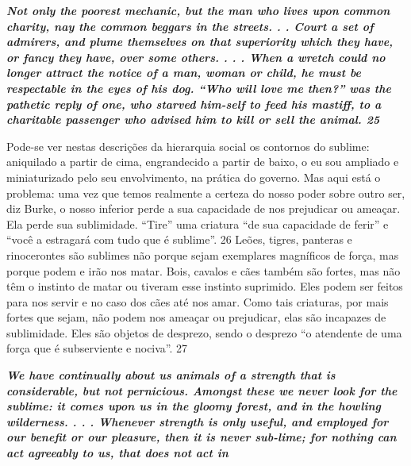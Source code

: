\par
 

 \textbf{\textit{Not only the poorest mechanic, but the man who lives upon common charity, nay the common beggars in the streets. . . Court a set of admirers, and plume themselves on that superiority which they have, or fancy they have, over some others. . . . When a wretch could no longer attract the notice of a man, woman or child, he must be respectable in the eyes of his dog. “Who will love me then?” was the pathetic reply of one, who starved him-self to feed his mastiff, to a charitable passenger who advised him to kill or sell the animal. {{\color{blue} 25} } } }  
 
 
\par
 
Pode-se ver nestas descrições da hierarquia social os contornos do sublime: aniquilado a partir de cima, engrandecido a partir de baixo, o eu sou ampliado e miniaturizado pelo seu envolvimento, na prática do governo. Mas aqui está o problema: uma vez que temos realmente a certeza do nosso poder sobre outro ser, diz Burke, o nosso inferior perde a sua capacidade de nos prejudicar ou ameaçar. Ela perde sua sublimidade. “Tire” uma criatura “de sua capacidade de ferir” e “você a estragará com tudo que é sublime”.
 {\color{blue} 26}  
Leões, tigres, panteras e rinocerontes são sublimes não porque sejam exemplares magníficos de força, mas porque podem e irão nos matar. Bois, cavalos e cães também são fortes, mas não têm o instinto de matar ou tiveram esse instinto suprimido. Eles podem ser feitos para nos servir e no caso dos cães até nos amar. Como tais criaturas, por mais fortes que sejam, não podem nos ameaçar ou prejudicar, elas são incapazes de sublimidade. Eles são objetos de desprezo, sendo o desprezo “o atendente de uma força que é subserviente e nociva”. 27
 
\par
 

 \textbf{\textit{We have continually about us animals of a strength that is considerable, but not pernicious. Amongst these we never look for the sublime: it comes upon us in the gloomy forest, and in the howling wilderness. . . . Whenever strength is only useful, and employed for our benefit or our pleasure, then it is never sub-lime; for nothing can act agreeably to us, that does not act in} }  
 
 
\par
 

 
\par
 

